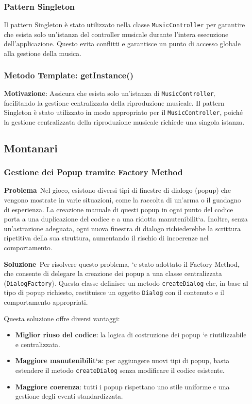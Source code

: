 \documentclass[a4paper,12pt]{report}
\begin{document}
\subsubsection{Pattern Singleton}
Il pattern Singleton \`e stato utilizzato nella classe \texttt{MusicController} per garantire che esista solo un'istanza del controller musicale durante l'intera esecuzione dell'applicazione. Questo evita conflitti e garantisce un punto di accesso globale alla gestione della musica.

\subsubsection{Metodo Template: getInstance()}
\textbf{Motivazione}: Assicura che esista solo un'istanza di \texttt{MusicController}, facilitando la gestione centralizzata della riproduzione musicale. Il pattern Singleton \`e stato utilizzato in modo appropriato per il \texttt{MusicController}, poich\'e la gestione centralizzata della riproduzione musicale richiede una singola istanza.


\subsection{Montanari}
\subsubsection{Gestione dei Popup tramite Factory Method}

\textbf{Problema}\
Nel gioco, esistono diversi tipi di finestre di dialogo (popup) che vengono mostrate in varie situazioni, come la raccolta di un'arma o il guadagno di esperienza. La creazione manuale di questi popup in ogni punto del codice porta a una duplicazione del codice e a una ridotta manutenibilit`a. Inoltre, senza un’astrazione adeguata, ogni nuova finestra di dialogo richiederebbe la scrittura ripetitiva della sua struttura, aumentando il rischio di incoerenze nel comportamento.

\textbf{Soluzione}\
Per risolvere questo problema, `e stato adottato il Factory Method, che consente di delegare la creazione dei popup a una classe centralizzata (\texttt{DialogFactory}). Questa classe definisce un metodo \texttt{createDialog} che, in base al tipo di popup richiesto, restituisce un oggetto \texttt{Dialog} con il contenuto e il comportamento appropriati.

Questa soluzione offre diversi vantaggi:
\begin{itemize}
\item \textbf{Miglior riuso del codice}: la logica di costruzione dei popup `e riutilizzabile e centralizzata.
\item \textbf{Maggiore manutenibilit`a}: per aggiungere nuovi tipi di popup, basta estendere il metodo \texttt{createDialog} senza modificare il codice esistente.
\item \textbf{Maggiore coerenza}: tutti i popup rispettano uno stile uniforme e una gestione degli eventi standardizzata.
\end{itemize}
\end{document}
